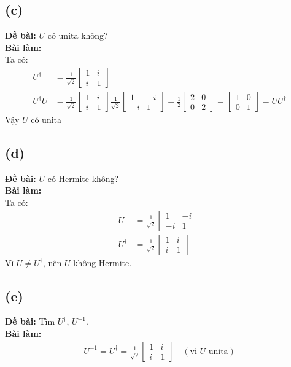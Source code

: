\subsection{(c)}
\textbf{Đề bài:} $U$ có unita không?\\
\textbf{Bài làm:}\\
Ta có:
\begin{align*}
    U^\dagger &= \frac{1}{\sqrt{2}}\begin{bmatrix}
        1 & i\\
        i & 1
    \end{bmatrix}\\
    U^\dagger U &= \frac{1}{\sqrt{2}}\begin{bmatrix}
        1 & i\\
        i & 1
    \end{bmatrix}
    \frac{1}{\sqrt{2}}\begin{bmatrix}
        1 & -i\\
        -i & 1
    \end{bmatrix}
    = \frac{1}{2} \begin{bmatrix}
        2 & 0 \\
        0 & 2
    \end{bmatrix} = \begin{bmatrix}
        1 & 0 \\
        0 & 1
    \end{bmatrix} = UU^\dagger
\end{align*}
Vậy $U$ có unita

\subsection{(d)}
\textbf{Đề bài:} $U$ có Hermite không?\\
\textbf{Bài làm:}\\
Ta có:
\begin{align*}
    U &= \frac{1}{\sqrt{2}}\begin{bmatrix}
        1 & -i\\
        -i & 1
    \end{bmatrix}\\
    U^\dagger &= \frac{1}{\sqrt{2}}\begin{bmatrix}
        1 & i\\
        i & 1
    \end{bmatrix} 
\end{align*}
Vì $U \ne U^\dagger$, nên $U$ không Hermite.

\subsection{(e)}
\textbf{Đề bài:} Tìm $U^{\dagger}$, $U^{-1}$.\\
\textbf{Bài làm:}
\begin{align*}
    U^{-1} = U^\dagger = \frac{1}{\sqrt{2}}\begin{bmatrix}
        1 & i\\
        i & 1
    \end{bmatrix} \quad (\text{vì $U$ unita})
\end{align*}

